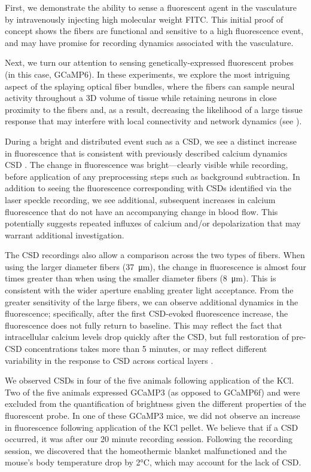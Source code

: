 First, we demonstrate the ability to sense a fluorescent agent in the 
vasculature by intravenously injecting high molecular weight FITC. 
This initial proof of concept shows the fibers are functional and 
sensitive to a high fluorescence event, and may have promise for 
recording dynamics associated with the vasculature.

Next, we turn our attention to sensing genetically-expressed 
fluorescent probes (in this case, GCaMP6). In these experiments, we 
explore the most intriguing aspect of the splaying optical fiber 
bundles, where the fibers can sample neural activity throughout a 3D 
volume of tissue while retaining neurons in close proximity to the 
fibers and, as a result, decreasing the likelihood of a large tissue 
response that may interfere with local connectivity and network 
dynamics (see ).

During a bright and distributed event such as a CSD, we see a distinct
 increase in fluorescence that is consistent with previously described
 calcium dynamics CSD \cite{Gniel:2010jn}. The change in fluorescence 
was bright---clearly visible while recording, before application of 
any preprocessing steps such as background subtraction. In addition to
 seeing the fluorescence corresponding with CSDs identified via the 
laser speckle recording, we see additional, subsequent increases in 
calcium fluorescence that do not have an accompanying change in blood 
flow. This potentially suggests repeated influxes of calcium and/or 
depolarization that may warrant additional investigation.

The CSD recordings also allow a comparison across the two types of 
fibers. When using the larger diameter fibers (37~\si{\micro\meter}), 
the change in fluorescence is almost four times greater than when 
using the smaller diameter fibers (8~\si{\micro\meter}). This is 
consistent with the wider aperture enabling greater light acceptance. 
From the greater sensitivity of the large fibers, we can observe 
additional dynamics in the fluorescence; specifically, after the first
 CSD-evoked fluorescence increase, the fluorescence does not fully 
return to baseline. This may reflect the fact that intracellular 
calcium levels drop quickly after the CSD, but full restoration of 
pre-CSD concentrations takes more than 5 minutes, or may reflect 
different variability in the response to CSD across cortical layers 
\cite{Gniel:2010jn}.

We observed CSDs in four of the five animals following application of 
the KCl. Two of the five animals expressed GCaMP3 (as opposed to 
GCaMP6f) and were excluded from the quantification of brightness given
 the different properties of the fluorescent probe. In one of these 
GCaMP3 mice, we did not observe an increase in fluorescence following 
application of the KCl pellet. We believe that if a CSD occurred, it 
was after our 20 minute recording session. Following the recording 
session, we discovered that the homeothermic blanket malfunctioned and
 the mouse's body temperature drop by 2\si{\celsius}, which may 
account for the lack of CSD.

